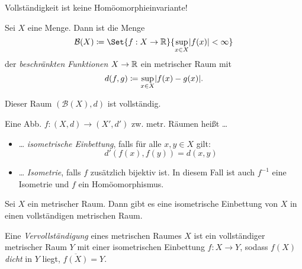 \documentclass{cheat-sheet}
\begin{document}

\begin{acht}
  Vollständigkeit ist keine Homöomorphieinvariante!
\end{acht}

\begin{defn}
  Sei $X$ eine Menge. Dann ist die Menge
  \[ \mathcal{B}(X) \coloneqq \Set{ f : X \to \R }{ \sup_{x \in X} \abs{f(x)} < \infty } \]
  der \emph{beschränkten Funktionen} $X \to \mathbb{R}$ ein metrischer Raum mit
  \[ d(f, g) \coloneqq \sup_{x \in X} \lvert f(x) - g(x)\rvert. \]
\end{defn}

\begin{prop}
  Dieser Raum $(\mathcal{B}(X), d)$ ist vollständig.
\end{prop}

\begin{defn}
  Eine Abb. $f : (X, d) \to (X', d')$ zw. metr. Räumen heißt \ldots
  \begin{itemize}
    \item \ldots{} \emph{isometrische Einbettung}, falls für alle $x , y \in X$ gilt:
    \[ d'(f(x), f(y)) = d(x, y) \]
    \item \ldots{} \emph{Isometrie}, falls $f$ zusätzlich bijektiv ist. In diesem Fall ist auch $f^{-1}$ eine Isometrie und $f$ ein Homöomorphismus.
  \end{itemize}
\end{defn}

\begin{prop}
  Sei $X$ ein metrischer Raum. Dann gibt es eine isometrische Einbettung von $X$ in einen vollständigen metrischen Raum.
\end{prop}


\begin{defn}
  Eine \emph{Vervollständigung} eines metrischen Raumes $X$ ist ein vollständiger metrischer Raum $Y$ mit einer isometrischen Einbettung $f : X \to Y$, sodass $f(X)$ \emph{dicht} in $Y$ liegt, \dh{} $\overline{f(X)} = Y$.
\end{defn}
\end{document}

